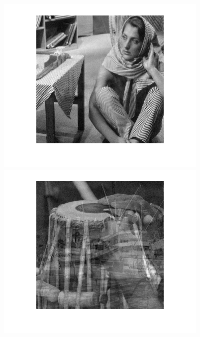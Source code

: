 \begin{figure}
{\begin{minipage}[b]{0.23\linewidth}
\includegraphics[width=1\linewidth]{images/efica_out3.png}\vspace{4pt}
\includegraphics[width=1\linewidth]{images/efica_out4.png}
\end{minipage}}
\end{figure}
